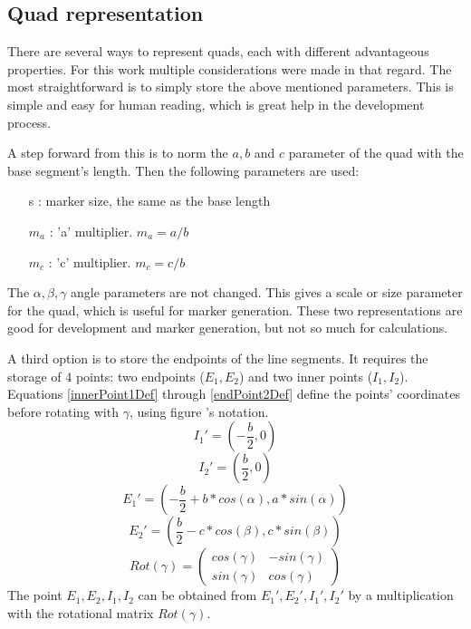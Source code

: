 \subsection{Quad representation}

There are several ways to represent quads, each with different advantageous properties.
For this work multiple considerations were made in that regard.
The most straightforward is to simply store the above mentioned parameters.
This is simple and easy for human reading, which is great help in the development process.

A step forward from this is to norm the $a,b$ and $c$ parameter of the quad with the base segment's length.
Then the following parameters are used:
\begin{itemize}
	\item[s]: marker size, the same as the base length
	\item[$m_a$]: 'a' multiplier. $m_a = a/b$
	\item[$m_c$]: 'c' multiplier. $m_c = c/b$
\end{itemize}
The $\alpha,\beta,\gamma$ angle parameters are not changed.
This gives a scale or size parameter for the quad, which is useful for marker generation.
These two representations are good for development and marker generation, but not so much for calculations.

A third option is to store the endpoints of the line segments.
It requires the storage of 4 points: two endpoints ($E_1,E_2$) and two inner points ($I_1,I_2$).
Equations \eqref{innerPoint1Def} through \eqref{endPoint2Def} define the points' coordinates before rotating with $\gamma$, using figure 's notation.
\begin{equation}
	\label{eq:innerPoint1Def}
	I_1' = (-\frac{b}{2}, 0)
\end{equation}
\begin{equation}
	\label{eq:innerPoint2Def}
	I_2' = (\frac{b}{2}, 0)
\end{equation}
\begin{equation}
	\label{eq:endPoint1Def}
	E_1' = (-\frac{b}{2} + b*cos(\alpha),a*sin(\alpha))
\end{equation}
\begin{equation}
	\label{eq:endPoint2Def}
	E_2' = (\frac{b}{2} - c*cos(\beta),c*sin(\beta))
\end{equation}
\begin{equation}
	\label{eq:rotMatrix}
	Rot(\gamma) = \left( \begin{array}{cc}
	cos(\gamma) & -sin(\gamma)  \\
	sin(\gamma) & cos(\gamma)  \end{array} \right)
\end{equation}
The point $E_1,E_2,I_1,I_2$ can be obtained from $E_1',E_2',I_1',I_2'$ by a multiplication with the rotational matrix $Rot(\gamma)$.

